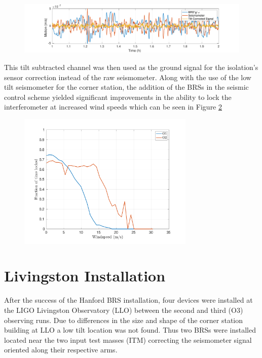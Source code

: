 \documentclass [12pt, proquest]{uwthesis}[2019]
\begin{document}
\begin{figure}%
\begin{center}
\includegraphics[width=\textwidth]{TiltCorrTime.pdf}
\caption{}
\label{subTime}
\end{center}
\end{figure}

This tilt subtracted channel was then used as the ground signal for the isolation's sensor correction instead of the raw seismometer. Along with the use of the low tilt seismometer for the corner station, the addition of the BRSs in the seismic control scheme yielded significant improvements in the ability to lock the interferometer at increased wind speeds which can be seen in Figure \ref{O2}

\begin{figure}%
\begin{center}
\includegraphics[width=0.75\textwidth]{Wind_LockedFraction_total.pdf}
\caption{}
\label{O2}
\end{center}
\end{figure}

\section{Livingston Installation}

\quad After the success of the Hanford BRS installation, four devices were installed at the LIGO Livingston Observatory (LLO) between the second and third (O3) observing runs. Due to differences in the size and shape of the corner station building at LLO a low tilt location was not found. Thus two BRSs were installed located near the two input test masses (ITM) correcting the seismometer signal oriented along their respective arms. 
\end{document}
